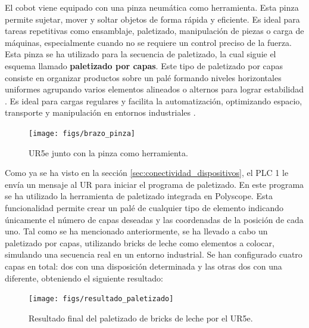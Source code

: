 El cobot viene equipado con una pinza neumática como herramienta. Esta pinza permite sujetar, mover y soltar objetos de forma rápida y eficiente. Es ideal para tareas repetitivas como ensamblaje, paletizado, manipulación de piezas o carga de máquinas, especialmente cuando no se requiere un control preciso de la fuerza. Esta pinza se ha utilizado para la secuencia de paletizado, la cual siguie el esquema llamado \textbf{paletizado por capas}. Este tipo de paletizado por capas consiste en organizar productos sobre un palé formando niveles horizontales uniformes agrupando varios elementos alineados o alternos para lograr estabilidad \cite{paletizado_capas}. Es ideal para cargas regulares y facilita la automatización, optimizando espacio, transporte y manipulación en entornos industriales \cite{paletizado_capas}. 

\begin{figure}[h!]
  \begin{center}
  	\texttt{[image: figs/brazo\_pinza]}
  \end{center}
  \caption{\centering UR5e junto con la pinza como herramienta.}
  \label{fig:brazo_pinza}
\end{figure}

Como ya se ha visto en la sección \ref{sec:conectividad_dispositivos}, el PLC 1 le envía un mensaje al UR para iniciar el programa de paletizado. En este programa se ha utilizado la herramienta de paletizado integrada en Polyscope. Esta funcionalidad permite crear un palé de cualquier tipo de elemento indicando únicamente el número de capas deseadas y las coordenadas de la posición de cada uno. Tal como se ha mencionado anteriormente, se ha llevado a cabo un paletizado por capas, utilizando bricks de leche como elementos a colocar, simulando una secuencia real en un entorno industrial. Se han configurado cuatro capas en total: dos con una disposición determinada y las otras dos con una diferente, obteniendo el siguiente resultado:

\begin{figure}[h!]
  \begin{center}
  	\texttt{[image: figs/resultado\_paletizado]}
  \end{center}
  \caption{\centering Resultado final del paletizado de bricks de leche por el UR5e.}
  \label{fig:resultado_paletizado}
\end{figure}

